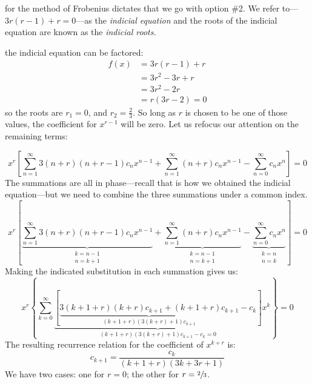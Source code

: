  for the method of Frobenius dictates that we go with option \#2.  We refer to---$3r(r-1)+r = 0$---as the \emph{indicial equation} and the roots of the indicial equation are known as the \emph{indicial roots.} 

 the indicial equation can be factored:
\begin{align*}
f(x) &= 3r(r-1)+r \\
&=3r^2-3r+r \\
&=3r^2-2r \\
&=r(3r-2) = 0
\end{align*}
so the roots are $r_1=0$, and $r_2 = \frac{2}{3}$. So long as $r$ is chosen to be one of those values, the coefficient for $x^{r-1}$ will be zero.  Let us refocus our attention on the remaining terms:

\begin{equation*}
x^r \left[\sum\limits_{n=1}^{\infty} 3(n+r)(n+r-1)c_nx^{n-1} + \sum\limits_{n=1}^{\infty} (n+r)c_nx^{n-1} - \sum\limits_{n=0}^{\infty}c_nx^n \right] = 0
\end{equation*}
The summations are all in phase---recall that is how we obtained the indicial equation---but we need to combine the three summations under a common index.
\begin{equation*}
x^r \left[\underbrace{\sum\limits_{n=1}^{\infty} 3(n+r)(n+r-1)c_nx^{n-1}}_{\substack{k=n-1 \\ n=k+1}} + \underbrace{\sum\limits_{n=1}^{\infty} (n+r)c_nx^{n-1}}_{\substack{k=n-1 \\ n=k+1}} - \underbrace{\sum\limits_{n=0}^{\infty}c_nx^n}_{\substack{k=n \\n=k}} \right] = 0
\end{equation*}
Making the indicated substitution in each summation gives us:
\begin{equation*}
x^r\left\{\sum\limits_{k=0}^{\infty} \underbrace{\left[\underbrace{3(k+1+r)(k+r)c_{k+1}+(k+1+r)c_{k+1}}_{(k+1+r)(3(k+r)+1)c_{k+1}} - c_k\right]}_{(k+1+r)(3(k+r)+1)c_{k+1} - c_k = 0}x^k\right\} = 0
\end{equation*}
The resulting recurrence relation for the coefficient of $x^{k+r}$ is:
\begin{equation*}
c_{k+1}=\frac{c_k}{(k+1+r)(3k+3r+1)}
\end{equation*}
We have two cases: one for $r=0$; the other for $r = \sfrac{2}{3}$.

